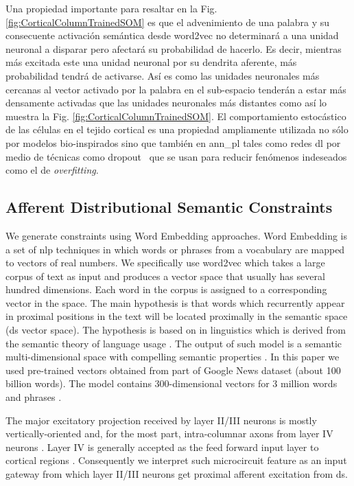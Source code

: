 {Una propiedad importante para resaltar en la Fig. \ref{fig:CorticalColumnTrainedSOM} es que el advenimiento de una palabra y su consecuente activación semántica desde word2vec no determinará a una unidad neuronal a disparar pero afectará su probabilidad de hacerlo.
Es decir, mientras más excitada este una unidad neuronal por su dendrita aferente, más probabilidad tendrá de activarse.
Así es como las unidades neuronales más cercanas al vector activado por la palabra en el sub-espacio tenderán a estar más densamente activadas que las unidades neuronales más distantes como así lo muestra la Fig. \ref{fig:CorticalColumnTrainedSOM}.
El comportamiento estocástico de las células en el tejido cortical es una propiedad ampliamente utilizada no sólo por modelos bio-inspirados \cite{harrison_l.m_stochastic_2005} sino que también en \gls{ann_pl} tales como redes \gls{dl} por medio de técnicas como dropout~\cite{Srivastava2014DropoutAS} que se usan para reducir fenómenos indeseados como el de \emph{overfitting}.
}{
\subsection{Afferent Distributional Semantic Constraints}

We generate  constraints using Word Embedding approaches. Word Embedding is a set of \gls{nlp} techniques in which words or phrases from a vocabulary are mapped to vectors of real numbers. We specifically use word2vec which takes a large corpus of text as input and produces a vector space that usually has several hundred dimensions. Each word in the corpus is assigned to a corresponding vector in the space. The main hypothesis is that words which recurrently appear in proximal positions in the text will be located proximally in the semantic space (\gls{ds} vector space).
The hypothesis is based on  in linguistics which is derived from the semantic theory of language usage \cite{doi:10.1080/00437956.1954.11659520}.
The output of such model is a semantic multi-dimensional space with compelling semantic properties \cite{mikolov2013linguistic, journals/corr/abs-1301-3781, Mikolov:2013:DRW:2999792.2999959}. In this paper we used pre-trained vectors obtained from part of Google News dataset (about 100 billion words). The model contains 300-dimensional vectors for 3 million words and phrases \cite{noauthor_google_nodate}.

The major excitatory projection received by layer II/III neurons is mostly vertically-oriented and, for the most part, intra-columnar axons
from layer IV neurons \cite{10.3389/neuro.01.1.1.002.2007,Lbke2007ExcitatorySF}.
Layer IV is generally accepted as the feed forward input layer to cortical regions \cite{doi:10.1177/1073858407305201}.
Consequently we interpret such microcircuit feature as an input gateway from which layer II/III neurons get proximal afferent excitation from \gls{ds}.

}
